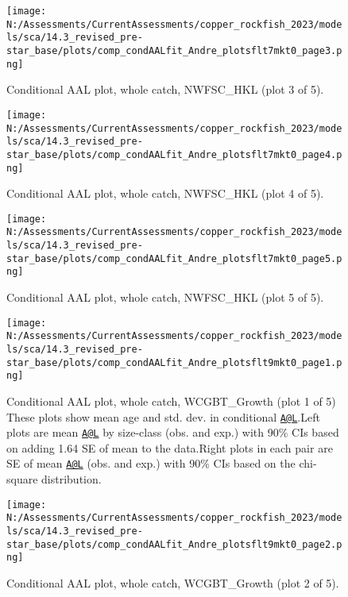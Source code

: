 \documentclass[11pt,
  english,
  letterpaper,
]{article}
\begin{document}
\begin{figure}
\centering
\texttt{[image: N:/Assessments/CurrentAssessments/copper\_rockfish\_2023/models/sca/14.3\_revised\_pre-star\_base/plots/comp\_condAALfit\_Andre\_plotsflt7mkt0\_page3.png]}
\caption{Conditional AAL plot, whole catch, NWFSC\_HKL (plot 3 of 5).\label{fig:comp_condAALfit_Andre_plotsflt7mkt0_page3}}
\end{figure}

\begin{figure}
\centering
\texttt{[image: N:/Assessments/CurrentAssessments/copper\_rockfish\_2023/models/sca/14.3\_revised\_pre-star\_base/plots/comp\_condAALfit\_Andre\_plotsflt7mkt0\_page4.png]}
\caption{Conditional AAL plot, whole catch, NWFSC\_HKL (plot 4 of 5).\label{fig:comp_condAALfit_Andre_plotsflt7mkt0_page4}}
\end{figure}

\begin{figure}
\centering
\texttt{[image: N:/Assessments/CurrentAssessments/copper\_rockfish\_2023/models/sca/14.3\_revised\_pre-star\_base/plots/comp\_condAALfit\_Andre\_plotsflt7mkt0\_page5.png]}
\caption{Conditional AAL plot, whole catch, NWFSC\_HKL (plot 5 of 5).\label{fig:comp_condAALfit_Andre_plotsflt7mkt0_page5}}
\end{figure}

\begin{figure}
\centering
\texttt{[image: N:/Assessments/CurrentAssessments/copper\_rockfish\_2023/models/sca/14.3\_revised\_pre-star\_base/plots/comp\_condAALfit\_Andre\_plotsflt9mkt0\_page1.png]}
\caption{Conditional AAL plot, whole catch, WCGBT\_Growth (plot 1 of 5) These plots show mean age and std. dev. in conditional \href{mailto:A@L}{\nolinkurl{A@L}}.Left plots are mean \href{mailto:A@L}{\nolinkurl{A@L}} by size-class (obs. and exp.) with 90\% CIs based on adding 1.64 SE of mean to the data.Right plots in each pair are SE of mean \href{mailto:A@L}{\nolinkurl{A@L}} (obs. and exp.) with 90\% CIs based on the chi-square distribution.\label{fig:comp_condAALfit_Andre_plotsflt9mkt0_page1}}
\end{figure}

\begin{figure}
\centering
\texttt{[image: N:/Assessments/CurrentAssessments/copper\_rockfish\_2023/models/sca/14.3\_revised\_pre-star\_base/plots/comp\_condAALfit\_Andre\_plotsflt9mkt0\_page2.png]}
\caption{Conditional AAL plot, whole catch, WCGBT\_Growth (plot 2 of 5).\label{fig:comp_condAALfit_Andre_plotsflt9mkt0_page2}}
\end{figure}
\end{document}
